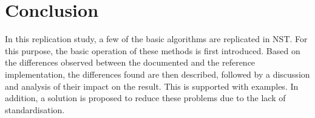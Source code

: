 \section{Conclusion}

In this replication study, a few of the basic algorithms are replicated in \gls{NST}. For this purpose, the basic operation of these methods is first introduced. Based on the differences observed between the documented and the reference implementation, the differences found are then described, followed by a discussion and analysis of their impact on the result. This is supported with examples. In addition, a solution is proposed to reduce these problems due to the lack of standardisation.